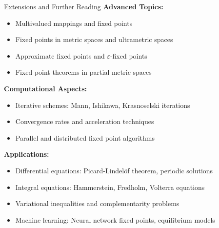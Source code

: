 \documentclass[aspectratio=169,10pt]{beamer}
\begin{document}
\begin{frame}{Extensions and Further Reading}
    \textbf{Advanced Topics:}
    \begin{itemize}
        \item Multivalued mappings and fixed points
        \item Fixed points in metric spaces and ultrametric spaces
        \item Approximate fixed points and $\varepsilon$-fixed points
        \item Fixed point theorems in partial metric spaces
    \end{itemize}

    \vspace{0.3cm}
    \textbf{Computational Aspects:}
    \begin{itemize}
        \item Iterative schemes: Mann, Ishikawa, Krasnoselski iterations
        \item Convergence rates and acceleration techniques
        \item Parallel and distributed fixed point algorithms
    \end{itemize}

    \vspace{0.3cm}
    \textbf{Applications:}
    \begin{itemize}
        \item Differential equations: Picard-Lindelöf theorem, periodic solutions
        \item Integral equations: Hammerstein, Fredholm, Volterra equations
        \item Variational inequalities and complementarity problems
        \item Machine learning: Neural network fixed points, equilibrium models
    \end{itemize}
\end{frame}
\end{document}
